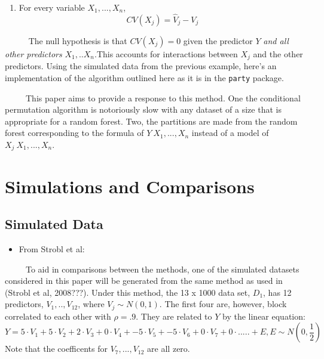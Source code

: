 \documentclass[12pt,twoside]{reedthesis}
\providecommand{\tightlist}{%
  \setlength{\itemsep}{0pt}\setlength{\parskip}{0pt}}
\begin{document}
  \begin{enumerate}
  \def\labelenumi{\arabic{enumi}.}
  \setcounter{enumi}{2}
  \tightlist
  \item
    For every variable \(X_1,..., X_n\), \[CV(X_j) = \hat{V}_j - V_j\]
  \end{enumerate}
  
  ~~~~~ The null hypothesis is that \(CV(X_j) = 0\) given the predictor
  \(Y\) \emph{and all other predictors} \(X_1,..X_n\).This accounts for
  interactions between \(X_j\) and the other predictors. Using the
  simulated data from the previous example, here's an implementation of
  the algorithm outlined here as it is in the \texttt{party} package.
  
  ~~~~~This paper aims to provide a response to this method. One the
  conditional permutation algorithm is notoriously slow with any dataset
  of a size that is appropriate for a random forest. Two, the partitions
  are made from the random forest corresponding to the formula of
  \(Y~X_1,...,X_n\) instead of a model of \(X_j~X_1,...,X_n\).
  
  \chapter{Simulations and Comparisons}\label{simulations-and-comparisons}
  
  \section{Simulated Data}\label{simulated-data}
  
  \begin{itemize}
  \tightlist
  \item
    From Strobl et al:
  \end{itemize}
  
  ~~~~~To aid in comparisons between the methods, one of the simulated
  datasets considered in this paper will be generated from the same method
  as used in (Strobl et al, 2008???). Under this method, the 13 x 1000
  data set, \(D_1\), has 12 predictors, \(V_1,..,V_{12}\), where
  \(V_j \sim N(0,1)\). The first four are, however, block correlated to
  each other with \(\rho = .9\). They are related to \(Y\) by the linear
  equation:
  \[Y = 5 \cdot V_1 + 5 \cdot V_2 + 2 \cdot V_3 + 0 \cdot V_4 + -5 \cdot V_5 + -5\cdot V_6 + 0\cdot V_7 + 0 \cdot ..... + E, E \sim N(0,\frac 1 2 )\]
  Note that the coefficents for \(V_7,...,V_{12}\) are all zero.
  
\end{document}
